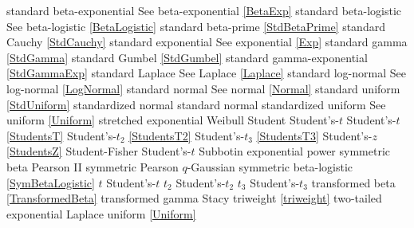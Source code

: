 standard beta-exponential			\dotfill	See beta-exponential \eqref{BetaExp}	\ncite	%
standard beta-logistic			\dotfill	See beta-logistic \eqref{BetaLogistic}		\ncite	%
standard beta-prime				\dotfill	\eqref{StdBetaPrime}				\ncite	%
standard Cauchy				\dotfill	\eqref{StdCauchy} 					\ncite	%
standard exponential				\dotfill	See exponential \eqref{Exp} 			\ncite	%
standard gamma 				\dotfill	\eqref{StdGamma} 					\ncite	%
standard Gumbel 				\dotfill	\eqref{StdGumbel} 					\ncite	%
standard gamma-exponential		\dotfill	\eqref{StdGammaExp} 				\ncite	%
standard Laplace				\dotfill	See Laplace \eqref{Laplace}			\ncite	%
standard log-normal				\dotfill	See log-normal \eqref{LogNormal} 		\ncite	%
standard normal 				\dotfill	See normal \eqref{Normal} 			\ncite	%
standard uniform				\dotfill	\eqref{StdUniform}					\ncite	%
standardized normal 				\dotfill	standard normal					\ncite	%
standardized uniform 			\dotfill	See uniform \eqref{Uniform}			\ncite	%
stretched exponential 			\dotfill	Weibull 								
Student						\dotfill 	Student's-$t$						\ncite	%
Student's-$t$					\dotfill	\eqref{StudentsT}  					\ncite	%
Student's-$t_2$					\dotfill	\eqref{StudentsT2}  					\ncite	%
Student's-$t_3$					\dotfill	\eqref{StudentsT3}  					\ncite	
Student's-$z$					\dotfill	\eqref{StudentsZ}					\ncite	%
Student-Fisher					\dotfill	Student's-$t$							%
Subbotin						\dotfill	exponential power					\ncite
symmetric beta					\dotfill	Pearson II							\ncite	%
symmetric Pearson				\dotfill	$q$-Gaussian						\mcite{\self}		%
symmetric beta-logistic			\dotfill	\eqref{SymBetaLogistic}				\mcite{\self}
%
$t$							\dotfill	Student's-$t$ 						\ncite	%
$t_2$						\dotfill	Student's-$t_2$ 					\ncite	%
$t_3$						\dotfill	Student's-$t_3$ 					\ncite
transformed beta				\dotfill	\eqref{TransformedBeta} 				\ncite	%
transformed gamma				\dotfill	Stacy 							\ncite %
triweight						\dotfill	\eqref{triweight}						\ncite
two-tailed exponential			\dotfill	Laplace							\ncite %
%
uniform  						\dotfill	\eqref{Uniform}						\ncite 	%
